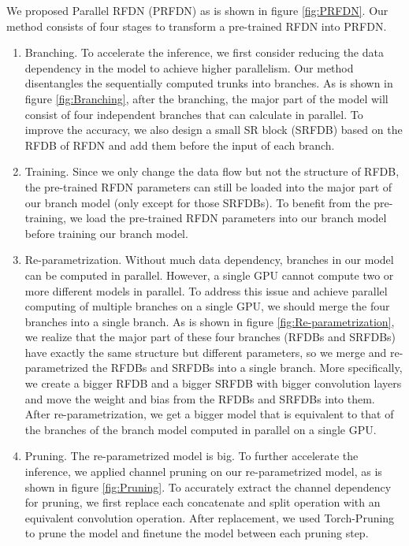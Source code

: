 \documentclass{article}
\begin{document}
We proposed Parallel RFDN (PRFDN) as is shown in figure \ref{fig:PRFDN}.
Our method consists of four stages to transform a pre-trained RFDN into PRFDN.
\begin{enumerate}
    \item Branching. To accelerate the inference, we first consider reducing the data dependency in the model to achieve higher parallelism. Our method disentangles the sequentially computed trunks into branches. As is shown in figure \ref{fig:Branching}, after the branching, the major part of the model will consist of four independent branches that can calculate in parallel. To improve the accuracy, we also design a small SR block (SRFDB) based on the RFDB of RFDN and add them before the input of each branch. 
    \item Training. Since we only change the data flow but not the structure of RFDB, the pre-trained RFDN parameters can still be loaded into the major part of our branch model (only except for those SRFDBs). To benefit from the pre-training, we load the pre-trained RFDN parameters into our branch model before training our branch model.
    \item Re-parametrization. Without much data dependency, branches in our model can be computed in parallel. However, a single GPU cannot compute two or more different models in parallel. To address this issue and achieve parallel computing of multiple branches on a single GPU, we should merge the four branches into a single branch. As is shown in figure \ref{fig:Re-parametrization}, we realize that the major part of these four branches (RFDBs and SRFDBs) have exactly the same structure but different parameters, so we merge and re-parametrized the RFDBs and SRFDBs into a single branch. More specifically, we create a bigger RFDB and a bigger SRFDB with bigger convolution layers and move the weight and bias from the RFDBs and SRFDBs into them. After re-parametrization, we get a bigger model that is equivalent to that of the branches of the branch model computed in parallel on a single GPU.
    \item Pruning. The re-parametrized model is big. To further accelerate the inference, we applied channel pruning on our re-parametrized model, as is shown in figure \ref{fig:Pruning}. To accurately extract the channel dependency for pruning, we first replace each concatenate and split operation with an equivalent convolution operation. After replacement, we used Torch-Pruning\cite{fang2023depgraph} to prune the model and finetune the model between each pruning step.
\end{enumerate}
\end{document}
